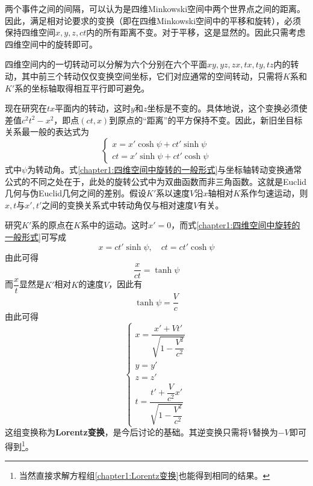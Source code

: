 两个事件之间的间隔，可以认为是四维Minkowski空间中两个世界点之间的距离。因此，满足相对论要求的变换（即在四维Minkowski空间中的平移和旋转），必须保持四维空间$x,y,z,ct$内的所有距离不变。对于平移，这是显然的。因此只需考虑四维空间中的旋转即可。

四维空间内的一切转动可以分解为六个分别在六个平面$xy,yz,zx,tx,ty,tz$内的转动，其中前三个转动仅仅变换空间坐标，它们对应通常的空间转动，只需将$K$系和$K'$系的坐标轴取得相互平行即可避免。

现在研究在$tx$平面内的转动，这时$y$和$z$坐标是不变的。具体地说，这个变换必须使差值$c^2t^2-x^2$，即点$(ct,x)$到原点的“距离”的平方保持不变。因此，新旧坐目标关系最一般的表达式为
\begin{equation}
\begin{cases}
	x = x'\cosh \psi + ct' \sinh \psi \\
	ct = x'\sinh \psi + ct' \cosh \psi
\end{cases}
\label{chapter1:四维空间中旋转的一般形式}
\end{equation}
式中$\psi$为转动角。式\eqref{chapter1:四维空间中旋转的一般形式}与坐标轴转动变换通常公式的不同之处在于，此处的旋转公式中为双曲函数而非三角函数。这就是Euclid几何与伪Euclid几何之间的差别。假设$K'$系以速度$V$沿$x$轴相对$K$系作匀速运动，则$x,t$与$x',t'$之间的变换关系式中转动角仅与相对速度$V$有关。

研究$K'$系的原点在$K$系中的运动。这时$x'=0$，而式\eqref{chapter1:四维空间中旋转的一般形式}可写成
\begin{equation*}
	x = ct'\sinh \psi,\quad ct = ct'\cosh \psi
\end{equation*}
由此可得
\begin{equation*}
	\frac{x}{ct} = \tanh \psi
\end{equation*}
而$\dfrac{x}{t}$显然是$K'$相对$K$的速度$V$，因此有
\begin{equation*}
	\tanh \psi = \frac{V}{c}
\end{equation*}
由此可得
\begin{equation}
\begin{cases}
	x = \dfrac{x'+Vt'}{\sqrt{1-\dfrac{V^2}{c^2}}} \\
	y = y' \\
	z = z' \\
	t = \dfrac{t'+\dfrac{V}{c^2}x'}{\sqrt{1-\dfrac{V^2}{c^2}}}
\end{cases}
\label{chapter1:Lorentz变换}
\end{equation}
这组变换称为{\bf Lorentz变换}，是今后讨论的基础。其逆变换只需将$V$替换为$-V$即可得到\footnote{当然直接求解方程组\eqref{chapter1:Lorentz变换}也能得到相同的结果。}。


